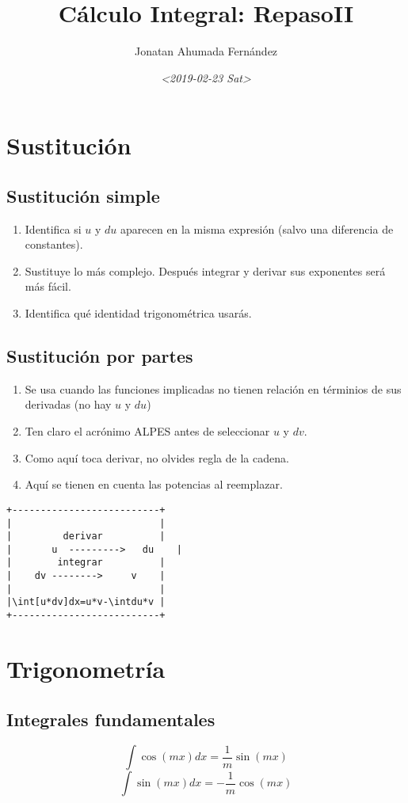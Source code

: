\documentclass[11pt]{article}
\author{Jonatan Ahumada Fernández}
\date{\textit{<2019-02-23 Sat>}}
\title{Cálculo Integral: RepasoII}
\begin{document}
\begin{multicols}{3}


\section{Sustitución}
\label{sec-1}
\subsection{Sustitución simple}
\label{sec-1-1}
\begin{enumerate}
\item Identifica si \(u\) y \(du\) aparecen en la misma expresión (salvo una diferencia de constantes).
\item Sustituye lo más complejo. Después integrar y derivar sus exponentes será más fácil.
\item Identifica qué identidad trigonométrica usarás.
\end{enumerate}

\subsection{Sustitución por partes}
\label{sec-1-2}
\begin{enumerate}
\item Se usa cuando las funciones implicadas no tienen relación en términios de sus derivadas (no hay \(u\) y \(du\))
\item Ten claro el acrónimo ALPES antes de seleccionar \(u\) y \(dv\).
\item Como aquí toca derivar, no olvides regla de la cadena.
\item Aquí se tienen en cuenta las potencias al reemplazar.
\end{enumerate}


\begin{verbatim}
+--------------------------+
|                          |
|         derivar          |
|   	u  --------->   du    |
|        integrar          |
|    dv -------->     v    |
|                          |
|\int[u*dv]dx=u*v-\intdu*v |   
+--------------------------+
\end{verbatim}
\section{Trigonometría}
\label{sec-2}
\subsection{Integrales fundamentales}
\label{sec-2-1}
\[\int \cos(mx)dx =  \frac{1}{m} \sin(mx)\]
\[\int \sin(mx)dx = - \frac{1}{m} \cos(mx)\]

\end{multicols}
\end{document}
